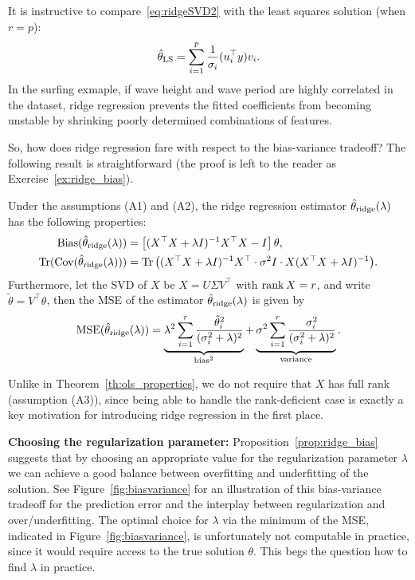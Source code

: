 It is instructive to compare~\eqref{eq:ridgeSVD2} with the least squares solution (when $r = p$):
\begin{equation}\label{eq:LS_svd}
  \hat{\theta}_{\text{LS}} = \sum_{i=1}^p \frac{1}{\sigma_i}(u_i^\top y)v_i.
\end{equation}
 In the surfing exmaple, if wave height and wave period are highly correlated in the dataset, ridge regression prevents the fitted coefficients from becoming unstable by shrinking poorly determined combinations of features.


So, how does ridge regression fare with respect to the bias-variance tradeoff? The following result is straightforward (the proof is left to the reader as Exercise~\ref{ex:ridge_bias}).

\begin{proposition}\label{prop:ridge_bias}
Under the assumptions (A1) and (A2), the ridge regression estimator $\hat{\theta}_{\text{ridge}}(\lambda)$ has the following properties:
\begin{align*}
\operatorname{Bias}(\hat{\theta}_{\text{ridge}}(\lambda)) &  = \left[(X^\top X + \lambda I)^{-1}X^\top X - I\right]\theta, \\
\operatorname{Tr}(\operatorname{Cov}(\hat{\theta}_{\text{ridge}}(\lambda))) & = \operatorname{Tr}\big((X^\top X + \lambda I)^{-1}X^\top \cdot \sigma^2 I \cdot X(X^\top X + \lambda I)^{-1}\big).
\end{align*}
Furthermore, let the SVD of $X$ be $X=U \Sigma V^\top$ with $\operatorname{rank} X = r$, and write  $\tilde\theta = V^\top\theta$, then the MSE of the estimator $\hat{\theta}_{\text{ridge}}(\lambda)$ is given by 
$$\text{MSE}(\hat{\theta}_{\text{ridge}}(\lambda)) = \underbrace{\lambda^2\sum_{i=1}^r \frac{\tilde\theta_i^2}{(\sigma_i^2+\lambda)^2}}_{\text{bias}^2} + \underbrace{\sigma^2\sum_{i=1}^r \frac{\sigma_i^2}{(\sigma_i^2+\lambda)^2}}_{\text{variance}}.$$

\end{proposition}

Unlike in Theorem~\ref{th:ols_properties}, we do not require that $X$ has full rank (assumption (A3)), since being able to handle the rank-deficient case is exactly a key motivation for introducing ridge regression in the first place.



\medskip
\noindent
\textbf{Choosing the regularization parameter:}
Proposition~\ref{prop:ridge_bias} suggests that by 
choosing an appropriate value for the regularization parameter $\lambda$ we can achieve a good balance between overfitting and underfitting of the solution.
See Figure~\ref{fig:biasvariance} for an illustration of this bias-variance tradeoff for the prediction error and the interplay between regularization and over/underfitting.
The optimal choice for $\lambda$ via the minimum of the MSE, indicated in Figure~\ref{fig:biasvariance}, is unfortunately not computable in practice, since it would require access to the true solution $\theta$. This begs the question 
how to find $\lambda$ in practice.

